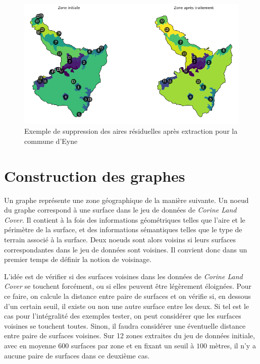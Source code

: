 \begin{figure}[!h]
    \centering
    \includegraphics[scale=0.5]{images/eyne-sup-residus}
    \caption{Exemple de suppression des aires résiduelles après extraction pour la commune d'Eyne}
    \label{fig:eyne-sup-residus}
\end{figure}


\section{Construction des graphes}







Un graphe représente une zone géographique de la manière suivante.
Un noeud du graphe correspond à une surface dans le jeu de données de \emph{Corine Land Cover}.
Il contient à la fois des informations géométriques telles que l'aire et le périmètre de la surface, et des informations sémantiques telles que le type de terrain associé à la surface.
Deux noeuds sont alors voisins si leurs surfaces correspondantes dans le jeu de données sont voisines.
Il convient donc dans un premier temps de définir la notion de voisinage. %

L'idée est de vérifier si des surfaces voisines dans les données de \emph{Corine Land Cover} se touchent forcément, ou si elles peuvent être légèrement éloignées.
Pour ce faire, on calcule la distance entre paire de surfaces et on vérifie si, en dessous d'un certain seuil, il existe ou non une autre surface entre les deux.
Si tel est le cas pour l'intégralité des exemples tester, on peut considérer que les surfaces voisines se touchent toutes.
Sinon, il faudra considérer une éventuelle distance entre paire de surfaces voisines.
Sur 12 zones extraites du jeu de données initiale, avec en moyenne 600 surfaces par zone et en fixant un seuil à $100$ mètres, il n'y a aucune paire de surfaces dans ce deuxième cas.


